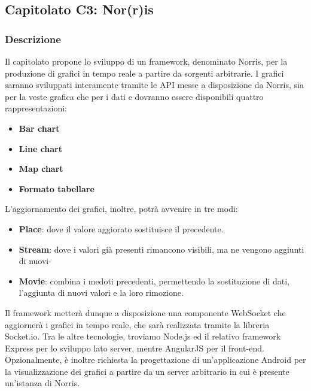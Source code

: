 
\subsection{Capitolato C3: Nor(r)is}

\subsubsection{Descrizione}
Il capitolato propone lo sviluppo di un framework, denominato Norris, per la produzione di grafici in tempo reale a partire da sorgenti arbitrarie. I grafici saranno sviluppati interamente tramite le API messe a disposizione da Norris, sia per la veste grafica che per i dati e dovranno essere disponibili quattro rappresentazioni:
\begin{itemize}
\item \textbf{Bar chart}
\item \textbf{Line chart}
\item \textbf{Map chart}
\item \textbf{Formato tabellare}
\end{itemize}
L'aggiornamento dei grafici, inoltre, potrà avvenire in tre modi: 
\begin{itemize}
\item \textbf{Place}: dove il valore aggiorato sostituisce il precedente.
\item \textbf{Stream}: dove i valori già presenti rimancono visibili, ma ne vengono aggiunti di nuovi-
\item \textbf{Movie}: combina i medoti precedenti, permettendo la sostituzione di dati, l'aggiunta di nuovi valori e la loro rimozione.
\end{itemize}
Il framework metterà dunque a disposizione una componente WebSocket che aggiornerà i grafici in tempo reale, che sarà realizzata tramite la libreria Socket.io. Tra le altre tecnologie, troviamo Node.js ed il relativo framework Express per lo sviluppo lato server, mentre AngularJS per il front-end. Opzionalmente, è inoltre richiesta la progettazione di un'applicazione Android per la visualizzazione dei grafici a partire da un server arbitrario in cui è presente un'istanza di Norris.

